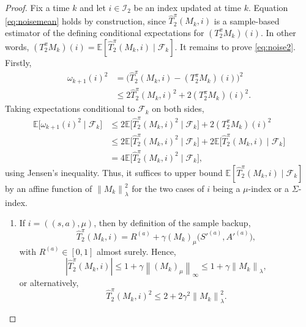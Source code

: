 \documentclass[10pt,a4paper]{amsart}
\newcommand{\E}{\mathbb{E}}
\newcommand{\LVert}{\left\lVert}
\newcommand{\Lvert}{\left\lvert}
\newcommand{\RVert}{\right\rVert}
\newcommand{\Rvert}{\right\rvert}
\newcommand{\norm}[1]{\left\lVert #1\right\rVert}
\begin{document}
\begin{proof}
Fix a time $k$ and let $i \in \mathcal{I}_2$ be an index updated at time $k$. Equation \eqref{eq:noisemean} holds by construction, since $\hat{T}^\pi_2(M_k, i)$ is a sample-based estimator of the defining conditional expectations for $(T^\pi_2M
_k)(i)$. In other words, $(T^\pi_2 M_k)(i) = \E[\hat{T}^\pi_2(M_k,i)\mid \mathcal{F}_k]$. It remains to prove \eqref{eq:noise2}. Firstly,
\begin{equation}
\begin{split}
\omega_{k+1}(i)^2 &= \big(\hat{T}^\pi_2(M_k, i) - (T^\pi_2M_k)(i)\big)^2 \\
&\le 2\hat{T}^\pi_2(M_k, i)^2 +2(T^\pi_2M_k)(i)^2.
\end{split}
\end{equation}
Taking expectations conditional to $\mathcal{F}_k$ on both sides,
\begin{equation}\label{eq:4times}
\begin{split}
\E\big[ \omega_{k+1}(i)^2 \mid \mathcal{F}_k\big] &\le 2\E\big[\hat{T}^\pi_2(M_k, i)^2 \mid \mathcal{F}_k\big] + 2(T^\pi_2M_k)(i)^2 \\
&\le 2\E\big[\hat{T}^\pi_2(M_k, i)^2 \mid \mathcal{F}_k\big] + 2\E\big[\hat{T}^\pi_2(M_k, i) \mid \mathcal{F}_k \big] \\
&= 4\E\big[\hat{T}^\pi_2(M_k, i)^2 \mid \mathcal{F}_k\big],
\end{split}
\end{equation}
using Jensen's inequality. Thus, it suffices to upper bound $\E[\hat{T}^\pi_2(M_k, i) \mid \mathcal{F}_k]$ by an affine function of $\norm{M_k}^2_\lambda$ for the two cases of $i$ being a $\mu$-index or a $\Sigma$-index.
\begin{enumerate}[leftmargin=*, itemsep=2pt, align=left]
\item[\textbf{Case 1:}] If $i = ((s, a), \mu)$, then by definition of the sample backup, 
\begin{equation}
\hat{T}^\pi_2(M_k, i) = R^{(a)} + \gamma (M_k)_\mu\big(S'^{(a)}, A'^{(a)}\big),
\end{equation}
with $R^{(a)} \in [0, 1]$ almost surely. Hence,
\begin{equation}
\Lvert \hat{T}^\pi_2(M_k, i)\Rvert \le 1 + \gamma \LVert (M_k)_\mu \RVert_\infty \le 1 + \gamma \LVert M_k \RVert_\lambda,
\end{equation}
or alternatively,
\begin{equation}
\hat{T}^\pi_2(M_k, i)^2 \le 2 + 2 \gamma^2 \LVert M_k\RVert^2_\lambda.
\end{equation}

\end{enumerate}
\end{proof}
\end{document}
